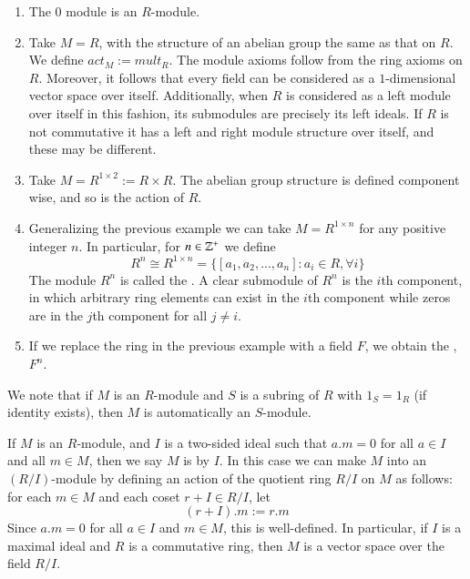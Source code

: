 \documentclass[12pt, a4paper, twoside, openright, titlepage]{book}
\begin{document}
\begin{eg}{}{}
    \leavevmode
    \begin{enumerate}
        \item The $0$ module is an $R$-module.
        \item Take $M =R$, with the structure of an abelian group the same as that on $R$. We define $act_M := mult_R$. The module axioms follow from the ring axioms on $R$. Moreover, it follows that every field can be considered as a $1$-dimensional vector space over itself. Additionally, when $R$ is considered as a left module over itself in this fashion, its submodules are precisely its left ideals. If $R$ is not commutative it has a left and right module structure over itself, and these may be different. 
        \item Take $M = R^{1\times 2} := R\times R$. The abelian group structure is defined component wise, and so is the action of $R$.
        \item Generalizing the previous example we can take $M = R^{1\times n}$ for any positive integer $n$. In particular, for $n \in \mathbb Z^+$ we define \begin{equation*}
                R^n \cong R^{1\times n}  = \{[a_1,a_2,...,a_n]: a_i \in R, \forall i\}
        \end{equation*}
            The module $R^n$ is called the . A clear submodule of $R^n$ is the $i$th component, in which arbitrary ring elements can exist in the $i$th component while zeros are in the $j$th component for all $j \neq i$.
        \item If we replace the ring in the previous example with a field $F$, we obtain the , $F^n$.
    \end{enumerate}
\end{eg}

We note that if $M$ is an $R$-module and $S$ is a subring of $R$ with $1_S = 1_R$ (if identity exists), then $M$ is automatically an $S$-module. 

\begin{defn}{}{}
    If $M$ is an $R$-module, and $I$ is a two-sided ideal such that $a.m = 0$ for all $a \in I$ and all $m \in M$, then we say $M$ is  by $I$. In this case we can make $M$ into an $(R/I)$-module by defining an action of the quotient ring $R/I$ on $M$ as follows: for each $m\in M$ and each coset $r+I \in R/I$, let \begin{equation*}
        (r+I).m := r.m
    \end{equation*}
    Since $a.m = 0$ for all $a \in I$ and $m \in M$, this is well-defined. In particular, if $I$ is a maximal ideal and $R$ is a commutative ring, then $M$ is a vector space over the field $R/I$.
\end{defn}
\end{document}
